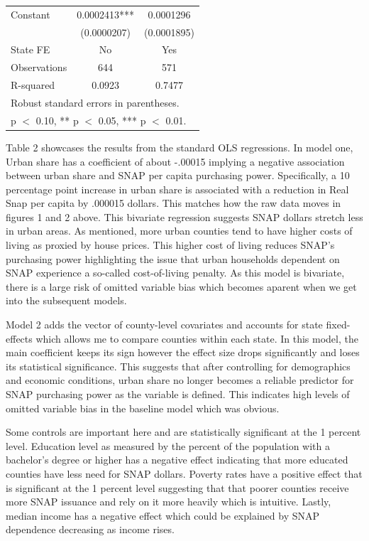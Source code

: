\documentclass{article}
\begin{document}
\begin{table}[H]
\begin{tabular}{lcc}
Constant            & 0.0002413***     & 0.0001296        \\
                    & (0.0000207)      & (0.0001895)      \\[6pt]
\hline
State FE            & No               & Yes              \\
Observations        & 644              & 571              \\
R-squared           & 0.0923           & 0.7477           \\
\hline\hline
\multicolumn{3}{l}{\footnotesize Robust standard errors in parentheses.} \\
\multicolumn{3}{l}{\footnotesize * p $<$ 0.10, ** p $<$ 0.05, *** p $<$ 0.01.} \\
\end{tabular}
\end{table}

Table 2 showcases the results from the standard OLS regressions. In model one, Urban share has a coefficient of about -.00015 implying a negative association between urban share and SNAP per capita purchasing power. Specifically, a 10 percentage point increase in urban share is associated with a reduction in Real Snap per capita by .000015 dollars. This matches how the raw data moves in figures 1 and 2 above. This bivariate regression suggests SNAP dollars stretch less in urban areas. As mentioned, more urban counties tend to have higher costs of living as proxied by house prices. This higher cost of living reduces SNAP's purchasing power highlighting the issue that urban households dependent on SNAP experience a so-called cost-of-living penalty. As this model is bivariate, there is a large risk of omitted variable bias which becomes aparent when we get into the subsequent models.

Model 2 adds the vector of county-level covariates and accounts for state fixed-effects which allows me to compare counties within each state. In this model, the main coefficient keeps its sign however the effect size drops significantly and loses its statistical significance. This suggests that after controlling for demographics and economic conditions, urban share no longer becomes a reliable predictor for SNAP purchasing power as the variable is defined. This indicates high levels of omitted variable bias in the baseline model which was obvious.

Some controls are important here and are statistically significant at the 1 percent level. Education level as measured by the percent of the population with a bachelor's degree or higher has a negative effect indicating that more educated counties have less need for SNAP dollars. Poverty rates have a positive effect that is significant at the 1 percent level suggesting that that poorer counties receive more SNAP issuance and rely on it more heavily which is intuitive. Lastly, median income has a negative effect which could be explained by SNAP dependence decreasing as income rises.
\end{document}
